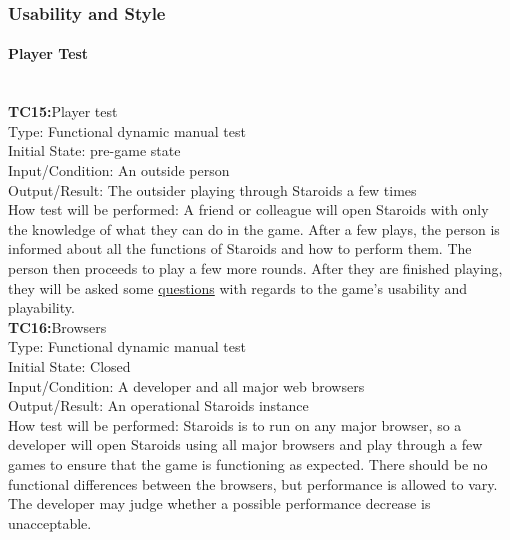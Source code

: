 \documentclass[12pt, titlepage]{article}
\begin{document}
\subsubsection{Usability and Style}

\paragraph{Player Test\\\\}


\textbf{TC15:}Player test\\

Type: Functional dynamic manual test\\

Initial State: pre-game state\\

Input/Condition: An outside person\\

Output/Result: The outsider playing through Staroids a few times\\

How test will be performed: A friend or colleague will open Staroids with only the knowledge of what they can do in the game. After a few plays, the person is informed about all the functions of Staroids and how to perform them. The person then proceeds to play a few more rounds. After they are finished playing, they will be asked some \hyperref[interview:questions]{questions} with regards to the game's usability and playability.\\

\textbf{TC16:}Browsers\\

Type: Functional dynamic manual test\\

Initial State: Closed\\

Input/Condition: A developer and all major web browsers\\

Output/Result: An operational Staroids instance\\

How test will be performed: Staroids is to run on any major browser, so a developer will open Staroids using all major browsers and play through a few games to ensure that the game is functioning as expected. There should be no functional differences between the browsers, but performance is allowed to vary. The developer may judge whether a possible performance decrease is unacceptable.\\
\end{document}
